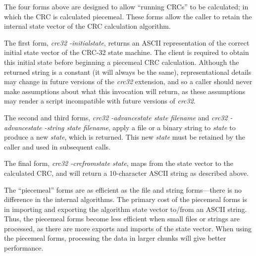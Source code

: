 \begin{tclcommanddescription}
\begin{tclcommandinternaldescription}{%
                                     }
The four forms above are designed to allow ``running CRCs'' to be calculated; in which
the CRC is calculated piecemeal.  These forms allow the caller to retain the internal
state vector of the CRC calculation algorithm.

The first form, \emph{crc32 -initialstate}, returns an ASCII representation of the
correct initial state vector of the CRC-32 state machine.  The client is required
to obtain this initial state before beginning a piecemeal CRC calculation.  Although the
returned string is a constant (it will always be the same), representational details
may change in future versions of the \emph{crc32} extension, and so a caller should never
make assumptions about what this invocation will return, as these assumptions may 
render a script incompatible with future versions of \emph{crc32}.

The second and third forms, \emph{crc32 -advancestate state filename}
and \emph{crc32 -advancestate -string state filename}, apply a file or a binary string
to \emph{state} to produce a new \emph{state}, which is returned.  This new \emph{state}
must be retained by the caller and used in subsequent calls.

The final form, \emph{crc32 -crcfromstate state}, maps from the state vector to the 
calculated CRC, and will return a 10-character ASCII string as described above.
\end{tclcommandinternaldescription}

\end{tclcommanddescription}


\begin{tclcommandusagenotes}
The ``piecemeal'' forms are as efficient as the file and string forms---there is no difference
in the internal algorithms.  The primary cost of the piecemeal forms is in importing and 
exporting the algorithm state vector to/from an ASCII string.  
Thus, the piecemeal forms become less efficient when
small files or strings are processed, as there are more exports and imports
of the state vector.  When using the piecemeal forms, processing the data in 
larger chunks will give better performance.
\end{tclcommandusagenotes}

